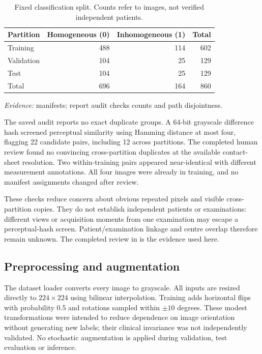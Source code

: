 \documentclass[11pt,a4paper]{article}
\newcommand{\code}[1]{\texttt{\detokenize{#1}}}
\newcommand{\source}[1]{{\footnotesize\textit{Evidence:} #1}}
\begin{document}
\begin{table}[htbp]
\centering
\caption{Fixed classification split. Counts refer to images, not verified independent patients.}
\label{tab:split}
\begin{tabular}{lrrr}\toprule
Partition & Homogeneous (0) & Inhomogeneous (1) & Total \\\midrule
Training & 488 & 114 & 602 \\
Validation & 104 & 25 & 129 \\
Test & 104 & 25 & 129 \\\midrule
Total & 696 & 164 & 860 \\\bottomrule
\end{tabular}
\par\source{\code{data/splits/} manifests; report audit checks counts and path disjointness.}
\end{table}

The saved audit reports no exact duplicate groups. A 64-bit grayscale difference hash screened perceptual similarity using Hamming distance at most four, flagging 22 candidate pairs, including 12 across partitions. The completed human review found no convincing cross-partition duplicates at the available contact-sheet resolution. Two within-training pairs appeared near-identical with different measurement annotations. All four images were already in training, and no manifest assignments changed after review.

These checks reduce concern about obvious repeated pixels and visible cross-partition copies. They do not establish independent patients or examinations: different views or acquisition moments from one examination may escape a perceptual-hash screen. Patient/examination linkage and centre overlap therefore remain unknown. The completed review in \code{reports/similarity_audit.md} is the evidence used here.

\subsection{Preprocessing and augmentation}
The dataset loader converts every image to grayscale. All inputs are resized directly to $224\times224$ using bilinear interpolation. Training adds horizontal flips with probability 0.5 and rotations sampled within $\pm10$ degrees. These modest transformations were intended to reduce dependence on image orientation without generating new labels; their clinical invariance was not independently validated. No stochastic augmentation is applied during validation, test evaluation or inference.
\end{document}
